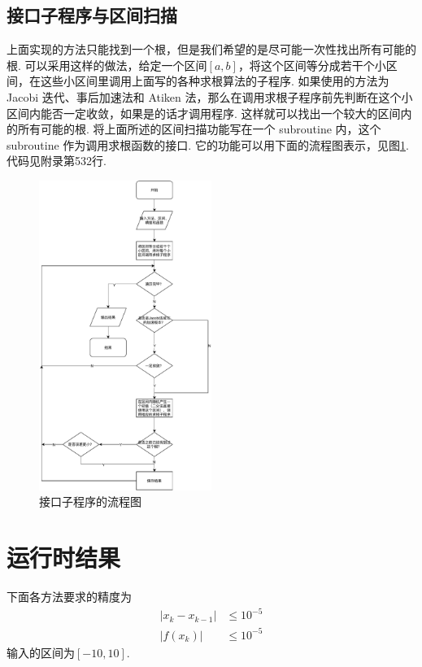 \documentclass{article}
\begin{document}
	\subsection{接口子程序与区间扫描}
	上面实现的方法只能找到一个根，但是我们希望的是尽可能一次性找出所有可能的根. 可以采用这样的做法，给定一个区间$[a, b]$，将这个区间等分成若干个小区间，在这些小区间里调用上面写的各种求根算法的子程序. 如果使用的方法为 Jacobi 迭代、事后加速法和 Atiken 法，那么在调用求根子程序前先判断在这个小区间内能否一定收敛，如果是的话才调用程序. 这样就可以找出一个较大的区间内的所有可能的根. 将上面所述的区间扫描功能写在一个 subroutine 内，这个 subroutine 作为调用求根函数的接口. 它的功能可以用下面的流程图表示，见图\ref{fig:multi_seeker}. 代码见附录第532行.
	\begin{figure}[h!tb]
		\centering
		\includegraphics[width=0.5\textwidth]{./utils/multi_seeker.pdf}
		\caption{ 接口子程序的流程图\label{fig:multi_seeker}}
	\end{figure}
	\section{运行时结果}
	下面各方法要求的精度为
	\[
	\begin{split}
		|x_k-x_{k-1}|&\le 10^{-5} \\
		|f(x_k)|&\le 10^{-5}
	\end{split}
	\]
	输入的区间为$[-10, 10]$.
\end{document}
